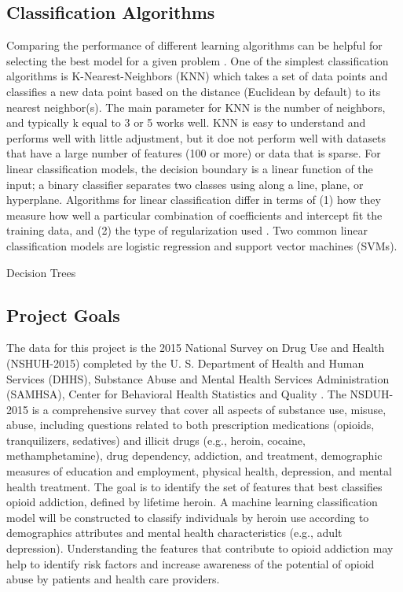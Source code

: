 \documentclass[sigconf]{acmart}
\begin{document}
\subsection{Classification Algorithms} 
Comparing the performance of different learning algorithms can be helpful for 
selecting the best model for a given problem \cite{raschka17}. One of the 
simplest classification algorithms is K-Nearest-Neighbors (KNN) which takes a 
set of data points and classifies a new data point based on the distance 
(Euclidean by default) to its nearest neighbor(s). The main parameter for KNN
is the number of neighbors, and typically k equal to 3 or 5 works well. KNN is
easy to understand and performs well with little adjustment, but it doe not 
perform well with datasets that have a large number of features (100 or more) 
or data that is sparse. For linear classification models, the decision boundary 
is a linear function of the input; a binary classifier separates two classes 
using along a line, plane, or hyperplane. Algorithms for linear classification 
differ in terms of (1) how they measure how well a particular combination of 
coefficients and intercept fit the training data, and (2) the type of 
regularization used \cite{muller17}. Two common linear classification models 
are logistic regression and support vector machines (SVMs). 


Decision Trees




\subsection{Project Goals} 

The data for this project is the 2015 National Survey on Drug Use and Health 
(NSHUH-2015) completed by the U. S. Department of Health and Human Services 
(DHHS), Substance Abuse and Mental Health Services Administration (SAMHSA), 
Center for Behavioral Health Statistics and Quality \cite{samhsa16}. The 
NSDUH-2015 is a comprehensive survey that cover all aspects of substance use, 
misuse, abuse, including questions related to both prescription medications 
(opioids, tranquilizers, sedatives) and illicit drugs (e.g., heroin, cocaine, 
methamphetamine), drug dependency, addiction, and treatment, demographic 
measures of education and employment, physical health, depression, and mental 
health treatment. The goal is to identify the set of features that best 
classifies opioid addiction, defined by lifetime heroin. A machine learning 
classification model will be constructed to classify individuals by heroin 
use according to demographics attributes and mental health characteristics 
(e.g., adult depression). Understanding the features that contribute to 
opioid addiction may help to identify risk factors and increase awareness
of the potential of opioid abuse by patients and health care providers. 
\end{document}
